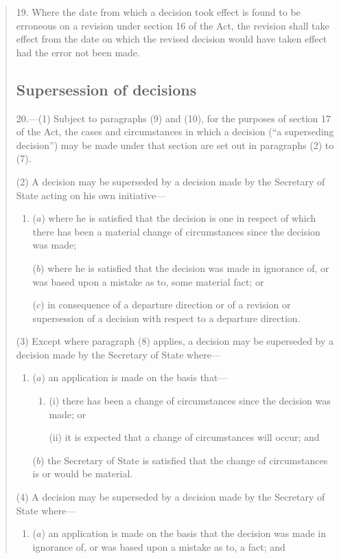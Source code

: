 \documentclass[12pt,a4paper]{article}
\begin{document}
\begin{quotation}
19.  Where the date from which a decision took effect is found to be erroneous on a revision under section 16 of the Act, the revision shall take effect from the date on which the revised decision would have taken effect had the error not been made.

\subsection*{Supersession of decisions}

20.—(1) Subject to paragraphs (9) and (10), for the purposes of section 17 of the Act, the cases and circumstances in which a decision (“a superseding decision”) may be made under that section are set out in paragraphs (2) to (7).

(2) A decision may be superseded by a decision made by the Secretary of State acting on his own initiative---
\begin{enumerate}\item[]
($a$) where he is satisfied that the decision is one in respect of which there has been a material change of circumstances since the decision was made;

($b$) where he is satisfied that the decision was made in ignorance of, or was based upon a mistake as to, some material fact; or

($c$) in consequence of a departure direction or of a revision or supersession of a decision with respect to a departure direction.
\end{enumerate}

(3) Except where paragraph (8) applies, a decision may be superseded by a decision made by the Secretary of State where---
\begin{enumerate}\item[]
($a$) an application is made on the basis that---
\begin{enumerate}\item[]
(i) there has been a change of circumstances since the decision was made; or

(ii) it is expected that a change of circumstances will occur; and
\end{enumerate}

($b$) the Secretary of State is satisfied that the change of circumstances is or would be material.
\end{enumerate}

(4) A decision may be superseded by a decision made by the Secretary of State where---
\begin{enumerate}\item[]
($a$) an application is made on the basis that the decision was made in ignorance of, or was based upon a mistake as to, a fact; and


\end{enumerate}
\end{quotation}
\end{document}
